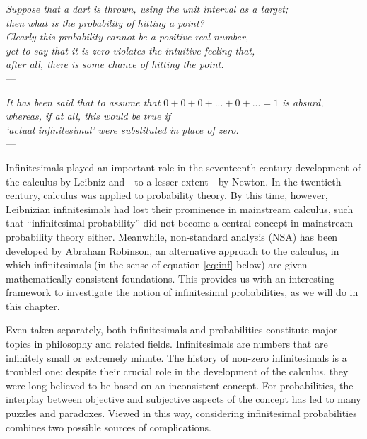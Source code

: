 \begin{flushright}
    {\footnotesize \textit{Suppose that a dart is thrown, using the unit interval as a target;\\
    then what is the probability of hitting a point?\\
    Clearly this probability cannot be a positive real number,\\
    yet to say that it is zero violates the intuitive feeling that,\\
    after all, there is some chance of hitting the point.}\\
    ---\citet[p.~171]{BernsteinWattenberg:1969}}
\end{flushright}

\begin{flushright}
    {\footnotesize \textit{It has been said that to assume that $0+0+0+ ... +0+ ... =1$ is absurd,\\
    whereas, if at all, this would be true if\\
    `actual infinitesimal' were substituted in place of zero.}\\
    ---\citet[p.~347]{deFinetti:1974}}\label{quote:dF}
\end{flushright}

Infinitesimals played an important role in the seventeenth century development of the calculus by Leibniz and---to a lesser extent---by Newton. In the twentieth century, calculus was applied to probability theory. By this time, however, Leibnizian infinitesimals had lost their prominence in mainstream calculus, such that ``infinitesimal probability'' did not become a central concept in mainstream probability theory either. Meanwhile, non-standard analysis (NSA) has been developed by Abraham Robinson, an alternative approach to the calculus, in which infinitesimals (in the sense of equation \ref{eq:inf} below) are given mathematically consistent foundations. This provides us with an interesting framework to investigate the notion of infinitesimal probabilities, as we will do in this chapter.

Even taken separately, both infinitesimals and probabilities constitute major topics in philosophy and related fields.
Infinitesimals are numbers that are infinitely small or extremely minute. The history of non-zero infinitesimals is a troubled one: despite their crucial role in the development of the calculus, they were long believed to be based on an inconsistent concept.
For probabilities, the interplay between objective and subjective aspects of the concept has led to many puzzles and paradoxes.
Viewed in this way, considering infinitesimal probabilities combines two possible sources of complications.

